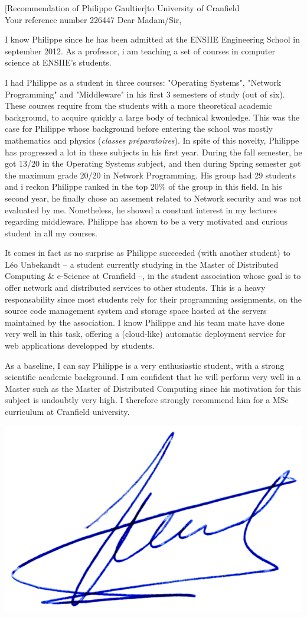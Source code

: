 \documentclass[a4paper,10pt]{article}
\begin{document}

\begin{letter}[Recommendation of Philippe Gaultier]{to}%
{University of Cranfield\\Your reference number 226447}
\vspace{-1cm}
Dear Madam/Sir, 

I know Philippe since  he has been admitted at the  ENSIIE Engineering School in
september 2012.   As a  professor, i am  teaching a set  of courses  in computer
science at ENSIIE's students.

I had  Philippe as  a student  in three  courses: "Operating  Systems", "Network
Programming"  and  "Middleware" in  his  first  3  semesters  of study  (out  of
six). These courses  require from the students with a  more theoretical academic
background, to acquire quickly a large body of technical kwonledge. This was the
case  for  Philippe whose  background  before  entering  the school  was  mostly
mathematics  and physics  (\textit{classes  préparatoires}).  In  spite of  this
novelty,  Philippe  has  progressed  a  lot  in  these  subjects  in  his  first
year. During the  fall semester, he got 13/20 in  the Operating Systems subject,
and  then  during  Spring  semester  got the  maximum  grade  20/20  in  Network
Programming. His group had  29 students and i reckon Philippe  ranked in the top
20\%  of the  group in  this field.   In his  second year,  he finally  chose an
assement related to  Network security and was not evaluated  by me. Nonetheless,
he showed a constant interest in my lectures regarding middleware.  Philippe has
shown to be a very motivated and curious student in all my courses.

It comes in fact as no surprise  as Philippe succeeded (with another student) to
Léo  Unbekandt --  a student  currently studying  in the  Master of  Distributed
Computing \& e-Science at Cranfield --, in the student association whose goal is
to offer  network and distributed  services to other  students. This is  a heavy
responsability since  most students rely  for their programming  assignments, on
the  source code  management  system and  storage space  hosted  at the  servers
maintained by the association. I know Philippe  and his team mate have done very
well in this task, offering a  (cloud-like) automatic deployment service for web
applications developped by students.

As a baseline, I can say Philippe  is a very enthusiastic student, with a strong
scientific academic background. I am confident that he will perform very well in
a Master  such as the Master  of Distributed Computing since  his motivation for
this subject is  undoubtly very high.  I therefore strongly  recommend him for a
MSc curriculum at Cranfield university.
\end{letter}
\begin{flushright}
\includegraphics[width=.2\textwidth]{signgenaud.jpg}
\end{flushright}
\end{document}
